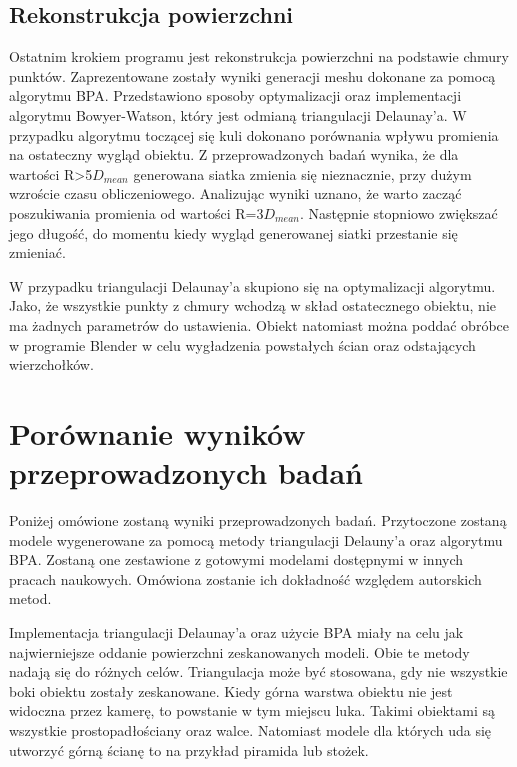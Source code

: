 \subsection{Rekonstrukcja powierzchni}
Ostatnim krokiem programu jest rekonstrukcja powierzchni na podstawie chmury punktów. Zaprezentowane zostały wyniki generacji meshu dokonane za pomocą algorytmu BPA. Przedstawiono sposoby optymalizacji oraz implementacji algorytmu Bowyer-Watson, który jest odmianą triangulacji Delaunay'a. W przypadku algorytmu toczącej się kuli dokonano porównania wpływu promienia na ostateczny wygląd obiektu. Z przeprowadzonych badań wynika, że dla wartości R>5$D_{mean}$ generowana siatka zmienia się nieznacznie, przy dużym wzroście czasu obliczeniowego. Analizując wyniki uznano, że warto zacząć poszukiwania promienia od wartości R=3$D_{mean}$. Następnie stopniowo zwiększać jego długość, do momentu kiedy wygląd generowanej siatki przestanie się zmieniać.

W przypadku triangulacji Delaunay'a skupiono się na optymalizacji algorytmu. Jako, że wszystkie punkty z chmury wchodzą w skład ostatecznego obiektu, nie ma żadnych parametrów do ustawienia. Obiekt natomiast można poddać obróbce w programie Blender w celu wygładzenia powstałych ścian oraz odstających wierzchołków. 

\section{Porównanie wyników przeprowadzonych badań }
Poniżej omówione zostaną wyniki przeprowadzonych badań. Przytoczone zostaną modele wygenerowane za pomocą metody triangulacji Delauny'a oraz algorytmu BPA. Zostaną one zestawione z gotowymi modelami dostępnymi w innych pracach naukowych. Omówiona zostanie ich dokładność względem autorskich metod.

Implementacja triangulacji Delaunay'a oraz użycie BPA miały na celu jak najwierniejsze oddanie powierzchni zeskanowanych modeli. Obie te metody nadają się do różnych celów. Triangulacja może być stosowana, gdy nie wszystkie boki obiektu zostały zeskanowane. Kiedy górna warstwa obiektu nie jest widoczna przez kamerę, to powstanie w tym miejscu luka. Takimi obiektami są wszystkie prostopadłościany oraz walce. Natomiast modele dla których uda się utworzyć górną ścianę to na przykład piramida lub stożek. 

